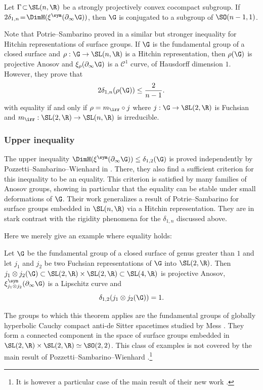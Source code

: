 \begin{conj}
Let $\Gamma\!\subset\!\SL(n,\R)$ be a strongly projectively convex cocompact sub\-group. If $2\delta_{1,n} \!=\! \DimH(\xi^{\sym}(\partial_\infty \G))$, then $\G$ is conjugated to a subgroup of \hbox{$\SO(n-1,1)$}.
\end{conj}

Note that Potrie--Sambarino proved in \cite{potrie2014} a similar but stronger inequality for Hitchin representations of surface groups. If $\G$ is the fundamental group of a closed surface and $\rho:\G\to \SL(n,\R)$ is a Hitchin representation, then $\rho(\G)$ is projective Anosov and $\xi_\rho(\partial_\infty \G)$ is a $\mathcal{C}^1$ curve, of Hausdorff dimension $1$. However, they prove that
\[2\delta_{1,n}(\rho(\G)) \leq \frac{2}{n-1}.\]
with equality if and only if $\rho = m_{\irr} \circ j$ where $j:\G \to \SL(2,\R)$ is Fuchsian and $m_{\irr}: \SL(2,\R) \to \SL(n,\R)$ is irreducible.

\subsubsection*{Upper inequality}

The upper inequality $\DimH(\xi^{\sym}(\partial_\infty \G)) \leq \delta_{1,2}(\G)$ is proved inde\-pendently by Pozzetti--Sambarino--Wienhard in \cite{PSW19}. There, they also find a sufficient criterion for this inequality to be an equality. This criterion is satisfied by many families of Anosov groups, showing in particular that the equality can be stable under small deformations of $\G$. Their work generalizes a result of Potrie--Sambarino for surface groups embedded in $\SL(n,\R)$ via a Hitchin representation. They are in stark contrast with the rigidity phenomena for the $\delta_{1,n}$ discussed above.

Here we merely give an example where equality holds:
\begin{theo} \label{theo - simple root exponent tensor product Fuchsian}
Let $\G$ be the fundamental group of a closed surface of genus greater than $1$ and let $j_1$ and $j_2$ be two Fuchsian representations of $\G$ into $\SL(2,\R)$. Then $j_1\otimes j_2(\G) \subset \SL(2,\R)\times \SL(2,\R) \subset \SL(4,\R)$ is projective Anosov, $\xi_{j_1\otimes j_2}^{\sym}(\partial_\infty \G)$ is a Lipschitz curve and
\[\delta_{1,2}(j_1\otimes j_2(\G)) = 1.\]
\end{theo}

The groups to which this theorem applies are the fundamental groups of globally hyperbolic Cauchy compact anti-de Sitter spacetimes studied by Mess \cite{mess2007lorentz}. They form a connected component in the space of surface groups embedded in \hbox{$\SL(2,\R)\times \SL(2,\R) \simeq \SO(2,2)$}. This class of examples is not covered by the main result of Pozzetti--Sambarino--Wienhard \cite{PSW19}.\footnote{It is however a particular case of the main result of their new work \cite{PSW19b}.}

